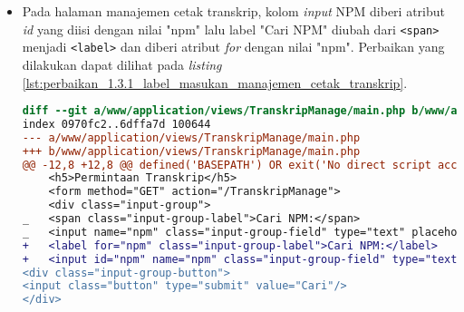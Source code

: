 \begin{itemize}
\item Pada halaman manajemen cetak transkrip, kolom \textit{input} NPM diberi atribut \textit{id} yang diisi dengan nilai "npm" lalu label "Cari NPM" diubah dari \texttt{<span>} menjadi \texttt{<label>} dan diberi atribut \textit{for} dengan nilai "npm". Perbaikan yang dilakukan dapat dilihat pada \textit{listing} \ref{lst:perbaikan_1.3.1_label_masukan_manajemen_cetak_transkrip}.
\begin{lstlisting}[frame=single, label={lst:perbaikan_1.3.1_label_masukan_manajemen_cetak_transkrip}, language=diff, caption=Perbaikan Kriteria Sukses 1.3.1 pada Kolom \textit{Input} di Halaman Manajemen Cetak Transkrip]
diff --git a/www/application/views/TranskripManage/main.php b/www/application/views/TranskripManage/main.php
index 0970fc2..6dffa7d 100644
--- a/www/application/views/TranskripManage/main.php
+++ b/www/application/views/TranskripManage/main.php
@@ -12,8 +12,8 @@ defined('BASEPATH') OR exit('No direct script access allowed');
    <h5>Permintaan Transkrip</h5>
    <form method="GET" action="/TranskripManage">
    <div class="input-group">
_   <span class="input-group-label">Cari NPM:</span>
_   <input name="npm" class="input-group-field" type="text" placeholder="2013730013" maxlength="10" minlength="10"<?= $npmQuery === NULL ? '' : " value='$npmQuery'" ?>/>
+   <label for="npm" class="input-group-label">Cari NPM:</label>
+   <input id="npm" name="npm" class="input-group-field" type="text" placeholder="2013730013" maxlength="10" minlength="10"<?= $npmQuery === NULL ? '' : " value='$npmQuery'" ?>/>
<div class="input-group-button">
<input class="button" type="submit" value="Cari"/>
</div>
\end{lstlisting}


\end{itemize}
